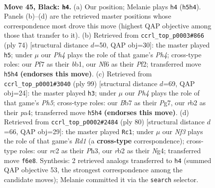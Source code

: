 \documentclass[11pt]{article}
\begin{document}
\clearpage

\begin{figure}[p]\centering
\begin{subfigure}{0.46\textwidth}\centering
\resizebox{\linewidth}{!}{%
\newchessgame
\chessboard[
  setfen={6k1/1b3p2/5np1/7p/8/5qP1/1RR4P/5NK1 b - - 3 45},
  showmover=false,
  pgfstyle=straightmove, color=movearrow, markmove={h5-h4}
]}
\caption{}
\end{subfigure}\hfill
\begin{subfigure}{0.46\textwidth}\centering
\resizebox{\linewidth}{!}{%
\newchessgame
\chessboard[
  setfen={2r2nk1/3r3p/1p3Q2/3p4/1P1B3P/8/5PP1/1b4K1 w - - 3 38},
  showmover=false,
  pgfstyle=straightmove, color=movearrow, markmove={h4-h5}
]}
\caption{}
\end{subfigure}
\\[4pt]
\begin{subfigure}{0.46\textwidth}\centering
\resizebox{\linewidth}{!}{%
\newchessgame
\chessboard[
  setfen={8/1b4pk/1p6/6q1/P2R3p/5P2/1P1RNKP1/8 b - - 1 50},
  showmover=false,
  pgfstyle=straightmove, color=movearrow, markmove={h4-h3}
]}
\caption{}
\end{subfigure}\hfill
\begin{subfigure}{0.46\textwidth}\centering
\resizebox{\linewidth}{!}{%
\newchessgame
\chessboard[
  setfen={6k1/4qpp1/r6p/2n5/6N1/2Q4P/5PP1/3R2K1 w - - 0 41},
  showmover=false,
  pgfstyle=straightmove, color=movearrow, markmove={d1-c1}
]}
\caption{}
\end{subfigure}
\caption{\textbf{Move 45, Black: \texttt{h4}.} (a) Our position; Melanie plays \texttt{h4} (\texttt{h5h4}). Panels (b)--(d) are the retrieved master positions whose correspondence most drove this move (highest QAP objective among those that transfer to it). (b) Retrieved from \texttt{ccrl\_top\_p0003\#866} (ply 74) [structural distance $d$=50, QAP obj=30]: the master played \texttt{h5}; under $\mu$ our \emph{Ph4} plays the role of that game's \emph{Ph4}; cross-type roles: our \emph{P}f7 as their \emph{b}b1, our \emph{N}f6 as their \emph{P}f2; transferred move \texttt{h5h4} \textbf{(endorses this move)}. (c) Retrieved from \texttt{ccrl\_top\_p0001\#3040} (ply 99) [structural distance $d$=69, QAP obj=24]: the master played \texttt{h3}; under $\mu$ our \emph{Ph4} plays the role of that game's \emph{Ph5}; cross-type roles: our \emph{B}b7 as their \emph{P}g7, our \emph{r}b2 as their \emph{p}a4; transferred move \texttt{h5h4} \textbf{(endorses this move)}. (d) Retrieved from \texttt{ccrl\_top\_p0002\#2484} (ply 80) [structural distance $d$=66, QAP obj=29]: the master played \texttt{Rc1}; under $\mu$ our \emph{Nf3} plays the role of that game's \emph{Rd1} (a \textbf{cross-type} correspondence); cross-type roles: our \emph{r}c2 as their \emph{P}h3, our \emph{r}b2 as their \emph{N}g4; transferred move \texttt{f6e8}. Synthesis: 2 retrieved analogs transferred to \texttt{h4} (summed QAP objective 53, the strongest correspondence among the candidate moves); Melanie committed it via the \texttt{search} selector.}
\label{fig:thought-m89}
\end{figure}
\end{document}
